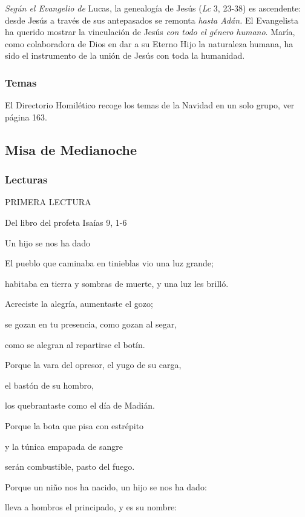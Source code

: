 \documentclass[]{article}
\begin{document}
\emph{Según el Evangelio de} Lucas, la genealogía de Jesús (\emph{Lc} 3,
23-38) es ascendente: desde Jesús a través de sus antepasados se remonta
\emph{hasta Adán.} El Evangelista ha querido mostrar la vinculación de
Jesús \emph{con todo el género humano}. María, como colaboradora de Dios
en dar a su Eterno Hijo la naturaleza humana, ha sido el instrumento de
la unión de Jesús con toda la humanidad.

\subsubsection{Temas}\label{temas-4}

El Directorio Homilético recoge los temas de la Navidad en un solo
grupo, ver página 163.

\subsection{Misa de Medianoche}\label{misa-de-medianoche}

\subsubsection{Lecturas}\label{lecturas-5}

PRIMERA LECTURA

Del libro del profeta Isaías 9, 1-6

Un hijo se nos ha dado

El pueblo que caminaba en tinieblas vio una luz grande;

habitaba en tierra y sombras de muerte, y una luz les brilló.

Acreciste la alegría, aumentaste el gozo;

se gozan en tu presencia, como gozan al segar,

como se alegran al repartirse el botín.

Porque la vara del opresor, el yugo de su carga,

el bastón de su hombro,

los quebrantaste como el día de Madián.

Porque la bota que pisa con estrépito

y la túnica empapada de sangre

serán combustible, pasto del fuego.

Porque un niño nos ha nacido, un hijo se nos ha dado:

lleva a hombros el principado, y es su nombre:
\end{document}
